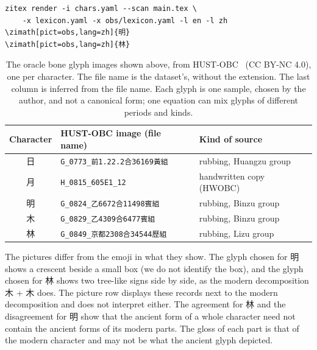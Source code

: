 \documentclass[11pt]{article}
\begin{document}
\begin{verbatim}
zitex render -i chars.yaml --scan main.tex \
    -x lexicon.yaml -x obs/lexicon.yaml -l en -l zh
\zimath[pict=obs,lang=zh]{明}
\zimath[pict=obs,lang=zh]{林}
\end{verbatim}


\begin{table}[ht]
\centering\small
{}%
\begin{tabular}{@{}cll@{}}
\toprule
Character & HUST-OBC image (file name) & Kind of source \\
\midrule
日 & \texttt{G\_0773\_前1.22.2合36169黃組} & rubbing, Huangzu group \\
月 & \texttt{H\_0815\_605E1\_12} & handwritten copy (HWOBC) \\
明 & \texttt{G\_0824\_乙6672合11498賓組} & rubbing, Binzu group \\
木 & \texttt{G\_0829\_乙4309合6477賓組} & rubbing, Binzu group \\
林 & \texttt{G\_0849\_京都2308合34544歷組} & rubbing, Lizu group \\
\bottomrule
\end{tabular}
\caption{The oracle bone glyph images shown above, from HUST-OBC~\cite{hustobc} (CC BY-NC 4.0), one per character. The file name is the
dataset's, without the extension. The last column is inferred from the file name. Each glyph is one sample, chosen by the author,
and not a canonical form; one equation can mix glyphs of different periods and kinds.}
\label{tab:glyphs}
\end{table}

\noindent The pictures differ from the emoji in what they show. The glyph chosen for 明 shows a crescent beside a small box (we do not identify the
box), and the glyph chosen for 林 shows two tree-like signs side by side, as the modern decomposition 木 + 木 does. The picture row displays these records
next to the modern decomposition and does not interpret either. The agreement for 林 and the disagreement for 明 show that the ancient form of a whole
character need not contain the ancient forms of its modern parts. The gloss of each part is that of the modern character and may not be what the ancient glyph
depicted.
\end{document}

